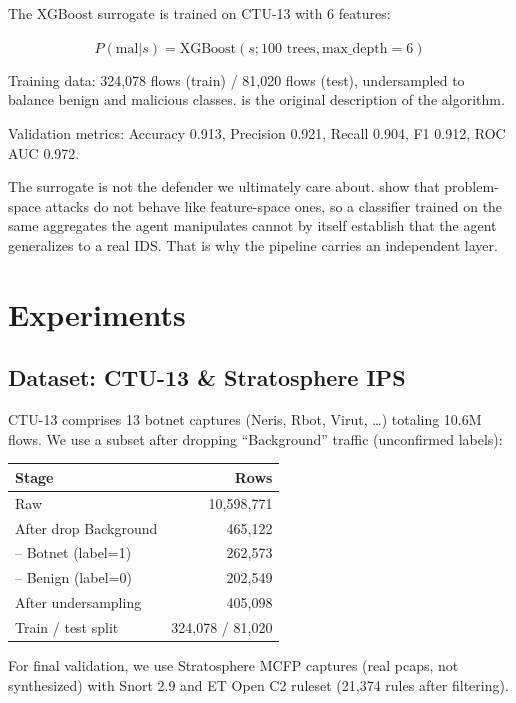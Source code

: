 \documentclass[12pt,a4paper]{report}
\begin{document}
The XGBoost surrogate is trained on CTU-13 with 6 features:

\begin{equation}
\hat{P}(\text{mal} | s) = \text{XGBoost}(s; 100 \text{ trees}, \text{max\_depth}=6)
\end{equation}

Training data: 324,078 flows (train) / 81,020 flows (test), undersampled to balance benign and malicious classes. \citet{chen2016xgboost} is the original description of the algorithm.

Validation metrics: Accuracy 0.913, Precision 0.921, Recall 0.904, F1 0.912, ROC AUC 0.972.

The surrogate is not the defender we ultimately care about. \citet{demetrio2020intriguing} show that problem-space attacks do not behave like feature-space ones, so a classifier trained on the same aggregates the agent manipulates cannot by itself establish that the agent generalizes to a real IDS. That is why the pipeline carries an independent \Snort{} layer.

\chapter{Experiments}

\section{Dataset: CTU-13 \& Stratosphere IPS}

CTU-13 comprises 13 botnet captures (Neris, Rbot, Virut, \ldots) totaling 10.6M flows. We use a subset after dropping ``Background'' traffic (unconfirmed labels):

\begin{table}[h]
\centering
\begin{tabular}{l|r}
Stage & Rows \\
\hline
Raw & 10,598,771 \\
After drop Background & 465,122 \\
  – Botnet (label=1) & 262,573 \\
  – Benign (label=0) & 202,549 \\
After undersampling & 405,098 \\
Train / test split & 324,078 / 81,020 \\
\end{tabular}
\end{table}

For final validation, we use Stratosphere MCFP captures (real pcaps, not synthesized) with Snort 2.9 and ET Open C2 ruleset (21,374 rules after filtering).
\end{document}
